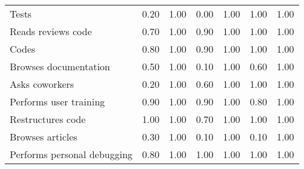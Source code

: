 \begin{tabular}{lrrrrrr}
Tests & 0.20 & 1.00 & 0.00 & 1.00 & 1.00 & 1.00 \\
Reads reviews code & 0.70 & 1.00 & 0.90 & 1.00 & 1.00 & 1.00 \\
Codes & 0.80 & 1.00 & 0.90 & 1.00 & 1.00 & 1.00 \\
Browses documentation & 0.50 & 1.00 & 0.10 & 1.00 & 0.60 & 1.00 \\
Asks coworkers & 0.20 & 1.00 & 0.60 & 1.00 & 1.00 & 1.00 \\
Performs user training & 0.90 & 1.00 & 0.90 & 1.00 & 0.80 & 1.00 \\
Restructures code & 1.00 & 1.00 & 0.70 & 1.00 & 1.00 & 1.00 \\
Browses articles & 0.30 & 1.00 & 0.10 & 1.00 & 0.10 & 1.00 \\
Performs personal debugging & 0.80 & 1.00 & 1.00 & 1.00 & 1.00 & 1.00 \\
\bottomrule
\end{tabular}
